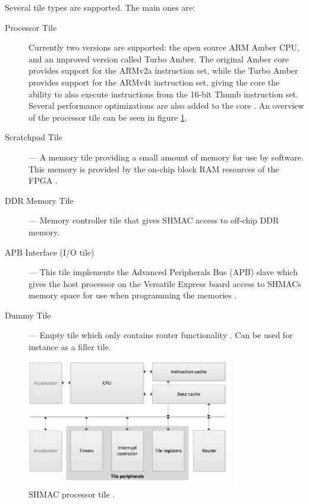 Several tile types are supported. The main ones are:

\begin{description}
  \item[Processor Tile] Currently two versions are supported: the open source ARM Amber CPU, and an improved version called Turbo Amber.
  	The original Amber core provides support for the ARMv2a instruction set, while the Turbo Amber
	provides support for the ARMv4t instruction set, giving the core the ability to also execute
	instructions from the 16-bit Thumb instruction set. Several performance optimizations are
	also added to the core \cite{turboamber}. An overview of the processor tile can be seen in
	figure \ref{fig:shmac-cpu}.
  \item[Scratchpad Tile] --- A memory tile providing a small amount of memory for use by software.
  	This memory is provided by the on-chip block RAM resources of the FPGA \cite{shmac-plan}.
  \item[DDR Memory Tile] --- Memory controller tile that gives SHMAC access to off-chip DDR memory.
  \item[APB Interface (I/O tile)] --- This tile implements the Advanced Peripherals Bus (APB) slave
  	which gives the host processor on the Versatile Express board access to SHMACs memory space
	for use when programming the memories \cite{shmac-plan}.
  \item[Dummy Tile] --- Empty tile which only contains router functionality \cite{shmac-plan}. Can be used for instance
  	as a filler tile.
\end{description}

\begin{figure}[htb]
    \centering
    \includegraphics[width=0.8\textwidth]{Figures/Heterogeneous/SHMACCPU}
    \caption{SHMAC processor tile \cite{shmac-plan}.}
    \label{fig:shmac-cpu}
\end{figure}

